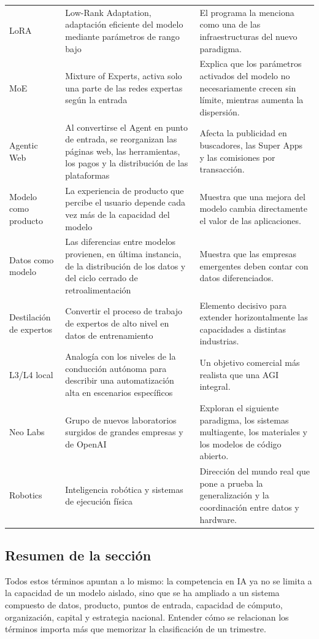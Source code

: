\documentclass[a4paper]{article}
\begin{document}
\begin{longtable}{p{}p{}p{}}
LoRA & Low-Rank Adaptation, adaptación eficiente del modelo mediante parámetros de rango bajo & El programa la menciona como una de las infraestructuras del nuevo paradigma. \\
MoE & Mixture of Experts, activa solo una parte de las redes expertas según la entrada & Explica que los parámetros activados del modelo no necesariamente crecen sin límite, mientras aumenta la dispersión. \\
Agentic Web & Al convertirse el Agent en punto de entrada, se reorganizan las páginas web, las herramientas, los pagos y la distribución de las plataformas & Afecta la publicidad en buscadores, las Super Apps y las comisiones por transacción. \\
Modelo como producto & La experiencia de producto que percibe el usuario depende cada vez más de la capacidad del modelo & Muestra que una mejora del modelo cambia directamente el valor de las aplicaciones. \\
Datos como modelo & Las diferencias entre modelos provienen, en última instancia, de la distribución de los datos y del ciclo cerrado de retroalimentación & Muestra que las empresas emergentes deben contar con datos diferenciados. \\
Destilación de expertos & Convertir el proceso de trabajo de expertos de alto nivel en datos de entrenamiento & Elemento decisivo para extender horizontalmente las capacidades a distintas industrias. \\
L3/L4 local & Analogía con los niveles de la conducción autónoma para describir una automatización alta en escenarios específicos & Un objetivo comercial más realista que una AGI integral. \\
Neo Labs & Grupo de nuevos laboratorios surgidos de grandes empresas y de OpenAI & Exploran el siguiente paradigma, los sistemas multiagente, los materiales y los modelos de código abierto. \\
Robotics & Inteligencia robótica y sistemas de ejecución física & Dirección del mundo real que pone a prueba la generalización y la coordinación entre datos y hardware. \\
\bottomrule
\end{longtable}

\subsection{Resumen de la sección}

Todos estos términos apuntan a lo mismo: la competencia en IA ya no se limita a la capacidad de un modelo aislado, sino que se ha ampliado a un sistema compuesto de datos, producto, puntos de entrada, capacidad de cómputo, organización, capital y estrategia nacional. Entender cómo se relacionan los términos importa más que memorizar la clasificación de un trimestre.
\end{document}
